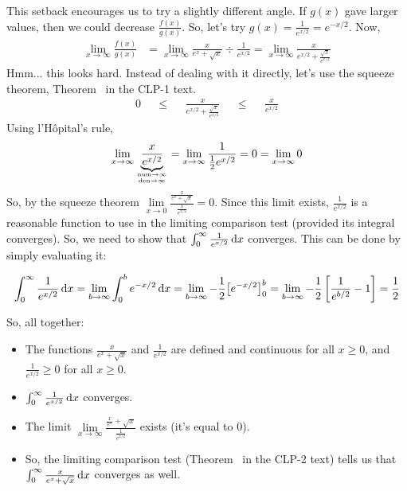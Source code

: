 \begin{solution}
\begin{description}
This setback encourages us to try a slightly different angle. If $g(x)$ gave larger values, then we could decrease $\frac{f(x)}{g(x)}$. So, let's try $g(x) = \frac{1}{e^{x/2}} = e^{-x/2}$. Now,
\begin{align*}
\lim_{x \to \infty}\frac{f(x)}{g(x)} &=
\lim_{x \to \infty}\frac{x}{e^x+\sqrt{x}}\div \frac{1}{e^{x/2}}=
\lim_{x \to \infty}\frac{x}{e^{x/2}+\frac{\sqrt{x}}{e^{x/2}}}
\end{align*}
Hmm... this looks hard. Instead of dealing with it directly, let's use the squeeze theorem, Theorem~ in the CLP-1 text.
\begin{align*}
0 &&\leq&& \frac{x}{e^{x/2}+\frac{\sqrt{x}}{e^{x/2 }}}&&\leq&& \frac{x}{e^{x/2}}
\end{align*}
Using l'H\^{o}pital's rule,
\[\lim_{x \to \infty} \underbrace{\frac{x}{e^{x/2}}}_{\atp{\mathrm{num}\to \infty}{\mathrm{den}\to\infty}} = \lim_{x \to \infty}\frac{1}{\frac{1}{2}e^{x/2}}=0 = \lim_{x \to \infty}0\]
So, by the squeeze theorem $\lim\limits_{x \to 0}\frac{\frac{x}{e^x+\sqrt{x}}}{\frac{1}{e^{x/2}}}=0$. Since this limit exists, $\frac{1}{e^{x/2}}$ is a reasonable function to use in the limiting comparison test (provided its integral converges). So, we need to show that $\int_0^\infty \frac{1}{e^{x/2}}\,\mathrm{d}x$ converges. This can be done by simply evaluating it:

\[\int_0^\infty \frac{1}{e^{x/2}}\,\mathrm{d}x = \lim_{b \to \infty}\int_0^b {e^{-x/2}}\,\mathrm{d}x
= \lim_{b \to \infty} -\frac{1}{2}\big[e^{-x/2}\big]_0^b
= \lim_{b \to \infty} -\frac{1}{2}\left[\frac{1}{e^{b/2}}-1\right] = \frac{1}{2}\]

So, all together:

\begin{itemize}
\item The functions $\frac{x}{e^x+\sqrt{x}}$ and $\frac{1}{e^{x/2}}$ are defined and continuous for all $x \geq 0$, and $\frac{1}{e^{x/2}} \ge 0$ for all $x \ge 0$.
\item $\int_0^\infty \frac{1}{e^{x/2}}\,\mathrm{d}x$ converges.
\item The limit $\lim\limits_{x \to \infty}\frac{\frac{x}{e^x}+\sqrt{x}}{\frac{1}{e^{x/2}}}$ exists (it's equal to 0).
\item So, the limiting comparison test (Theorem~
in the CLP-2 text) tells us that $\int_0^\infty \frac{x}{e^x+\sqrt{x}}\,\mathrm{d}x$ converges as well.
\end{itemize}
\end{description}

\end{solution}


